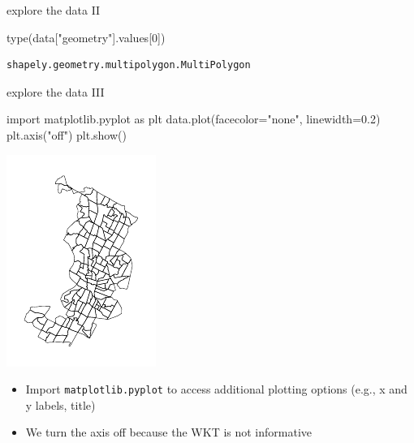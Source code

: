 \documentclass[
  ignorenonframetext,
]{beamer}
\newenvironment{Shaded}{\begin{snugshade}}{\end{snugshade}}
\newcommand{\BuiltInTok}[1]{\textcolor[rgb]{0.00,0.23,0.31}{#1}}
\newcommand{\DecValTok}[1]{\textcolor[rgb]{0.68,0.00,0.00}{#1}}
\newcommand{\FloatTok}[1]{\textcolor[rgb]{0.68,0.00,0.00}{#1}}
\newcommand{\ImportTok}[1]{\textcolor[rgb]{0.00,0.46,0.62}{#1}}
\newcommand{\NormalTok}[1]{\textcolor[rgb]{0.00,0.23,0.31}{#1}}
\newcommand{\OperatorTok}[1]{\textcolor[rgb]{0.37,0.37,0.37}{#1}}
\newcommand{\StringTok}[1]{\textcolor[rgb]{0.13,0.47,0.30}{#1}}
\providecommand{\tightlist}{%
  \setlength{\itemsep}{0pt}\setlength{\parskip}{0pt}}\usepackage{longtable,booktabs,array}
\begin{document}
\begin{frame}[fragile]{explore the data II}
\label{explore-the-data-ii}
\begin{Shaded}
\begin{Highlighting}[]
\BuiltInTok{type}\NormalTok{(data[}\StringTok{"geometry"}\NormalTok{].values[}\DecValTok{0}\NormalTok{])}
\end{Highlighting}
\end{Shaded}

\begin{verbatim}
shapely.geometry.multipolygon.MultiPolygon
\end{verbatim}
\end{frame}

\begin{frame}[fragile]{explore the data III}
\label{explore-the-data-iii}
\begin{Shaded}
\begin{Highlighting}[]
\ImportTok{import}\NormalTok{ matplotlib.pyplot }\ImportTok{as}\NormalTok{ plt}
\NormalTok{data.plot(facecolor}\OperatorTok{=}\StringTok{"none"}\NormalTok{, linewidth}\OperatorTok{=}\FloatTok{0.2}\NormalTok{)}
\NormalTok{plt.axis(}\StringTok{"off"}\NormalTok{)}
\NormalTok{plt.show()}
\end{Highlighting}
\end{Shaded}

\includegraphics{spatial_2_files/figure-beamer/cell-15-output-1.pdf}

\begin{itemize}
\tightlist
\item
  Import \texttt{matplotlib.pyplot} to access additional plotting
  options (e.g., x and y labels, title)
\item
  We turn the axis off because the WKT is not informative
\end{itemize}
\end{frame}
\end{document}
